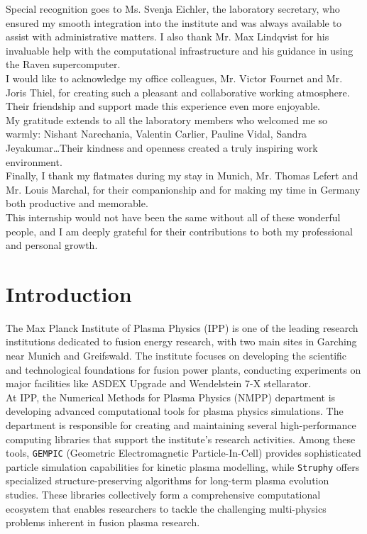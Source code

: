 \documentclass[a4paper,12pt,twoside]{report}
\begin{document}
Special recognition goes to Ms. Svenja Eichler, the laboratory secretary, who ensured my smooth integration into the institute and was always available to assist with administrative matters. I also thank Mr. Max Lindqvist for his invaluable help with the computational infrastructure and his guidance in using the Raven supercomputer.\\

I would like to acknowledge my office colleagues, Mr. Victor Fournet and Mr. Joris Thiel, for creating such a pleasant and collaborative working atmosphere. Their friendship and support made this experience even more enjoyable.\\

My gratitude extends to all the laboratory members who welcomed me so warmly: Nishant Narechania, Valentin Carlier, Pauline Vidal, Sandra Jeyakumar\dots Their kindness and openness created a truly inspiring work environment.\\

Finally, I thank my flatmates during my stay in Munich, Mr. Thomas Lefert and Mr. Louis Marchal, for their companionship and for making my time in Germany both productive and memorable.\\

This internship would not have been the same without all of these wonderful people, and I am deeply grateful for their contributions to both my professional and personal growth.\\


\newpage
\tableofcontents
\thispagestyle{test}

\newpage
\listoffigures
{}


\newpage
\chapter{Introduction}

The Max Planck Institute of Plasma Physics (IPP) is one of the leading research institutions dedicated to fusion energy research, with two main sites in Garching near Munich and Greifswald. The institute focuses on developing the scientific and technological foundations for fusion power plants, conducting experiments on major facilities like ASDEX Upgrade and Wendelstein 7-X stellarator. \\

At IPP, the Numerical Methods for Plasma Physics (NMPP) department is developing advanced computational tools for plasma physics simulations. The department is responsible for creating and maintaining several high-performance computing libraries that support the institute's research activities. Among these tools, \texttt{GEMPIC} (Geometric Electromagnetic Particle-In-Cell) provides sophisticated particle simulation capabilities for kinetic plasma modelling, while \texttt{Struphy} offers specialized structure-preserving algorithms for long-term plasma evolution studies. These libraries collectively form a comprehensive computational ecosystem that enables researchers to tackle the challenging multi-physics problems inherent in fusion plasma research.\\
\end{document}
